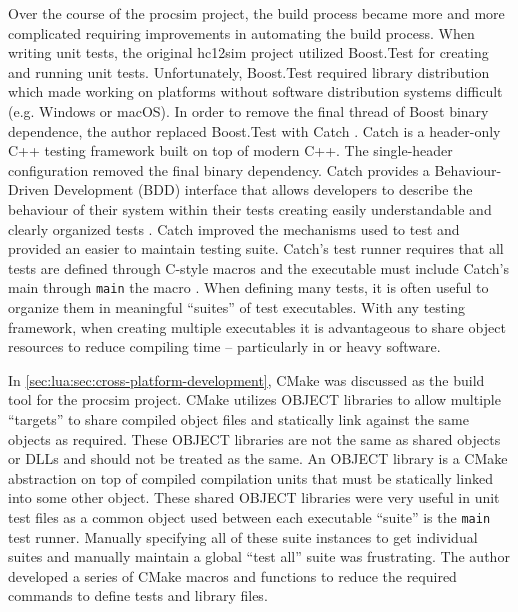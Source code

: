Over the course of the procsim project, the build process became more and more complicated requiring improvements in automating the build process. When writing unit tests, the original hc12sim project utilized Boost.Test \cite{Boost1.53.0:Test} for creating and running unit tests. Unfortunately, Boost.Test required library distribution which made working on platforms without software distribution systems difficult (e.g. Windows or macOS). In order to remove the final thread of Boost binary dependence, the author replaced Boost.Test with Catch \cite{CatchLib}. Catch is a header-only C++ testing framework built on top of modern C++. The single-header configuration removed the final binary dependency. Catch provides a Behaviour-Driven Development (BDD) interface that allows developers to describe the behaviour of their system within their tests creating easily understandable and clearly organized tests \cite{Solis2011}. Catch improved the mechanisms used to test and provided an easier to maintain testing suite. Catch's test runner requires that all tests are defined through C-style macros and the executable must include Catch's main through \verb|main| the  macro \cite{CatchLib:Tutorial}. When defining many tests, it is often useful to organize them in meaningful ``suites'' of test executables. With any testing framework, when creating multiple executables it is advantageous to share object resources to reduce compiling time -- particularly in  or  heavy software.

In \cref{sec:lua:sec:cross-platform-development}, CMake was discussed as the build tool for the procsim project. CMake utilizes OBJECT libraries to allow multiple ``targets'' to share compiled object files and statically link against the same objects as required. These OBJECT libraries are not the same as shared objects or DLLs and should not be treated as the same. An OBJECT library is a CMake abstraction on top of compiled compilation units that must be statically linked into some other object. These shared OBJECT libraries were very useful in unit test files as a common object used between each executable ``suite'' is the \verb|main| test runner. Manually specifying all of these suite instances to get individual suites and manually maintain a global ``test all'' suite was frustrating. The author developed a series of CMake macros \cite{CMake:macro} and functions \cite{CMake:function} to reduce the required commands to define tests and library files.

